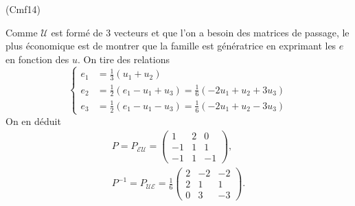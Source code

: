 \begin{tiny}(Cmf14)\end{tiny} Comme $\mathcal{U}$ est formé de 3 vecteurs et que l'on a besoin des matrices de passage, le plus économique est de montrer que la famille est génératrice en exprimant les $e$ en fonction des $u$. On tire des relations
\[
\left\lbrace
  \begin{aligned}
    e_1 &= \frac{1}{3}\left(u_1 + u_2\right)\\
    e_2 &= \frac{1}{2}\left(e_1 -u_1 + u_3\right) = \frac{1}{6}\left(-2u_1 + u_2 + 3u_3\right)\\
    e_3 &= \frac{1}{2}\left(e_1 -u_1 - u_3\right) =\frac{1}{6}\left(-2u_1 + u_2 - 3u_3\right)
  \end{aligned}
\right.
\]
On en déduit
\begin{multline*}
  P = P_{\mathcal{E}\mathcal{U}}=
  \begin{pmatrix}
    1 & 2 & 0 \\ -1 & 1 & 1 \\ -1 & 1 & -1
  \end{pmatrix},\\
P^{-1} = P_{\mathcal{U}\mathcal{E}}= \frac{1}{6}
  \begin{pmatrix}
    2 & -2 & -2 \\ 2 & 1 & 1 \\ 0 & 3 & -3
  \end{pmatrix}.
\end{multline*}

